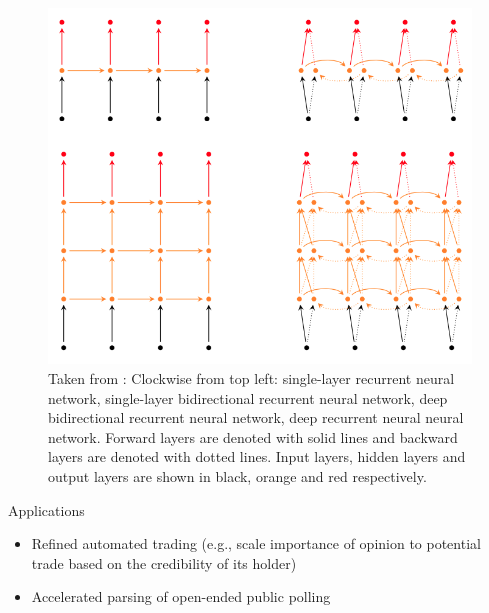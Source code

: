 \documentclass[final]{beamer}
\newlength{\onecolwid}
\begin{document}
\begin{frame}[t]
\begin{columns}[t]
\begin{column}{\onecolwid}
\begin{figure}
\includegraphics[width=0.8\linewidth]{bidrnn-irsoy.png}
\caption{Taken from \cite{irsoy2014opinion}: Clockwise from top left: single-layer recurrent neural network, single-layer bidirectional recurrent neural network, deep bidirectional recurrent neural network, deep recurrent neural neural network. Forward layers are denoted with solid lines and backward layers are denoted with dotted lines. Input layers, hidden layers and output layers are shown in black, orange and red respectively.}
\label{bidrnn-fig}
\end{figure}



\begin{alertblock}{Applications}

\begin{itemize}
\item Refined automated trading (e.g., scale importance of opinion to potential trade based on the credibility of its holder)
\item Accelerated parsing of open-ended public polling
\end{itemize}

\end{alertblock}



\end{column}
\end{columns}
\end{frame}
\end{document}
